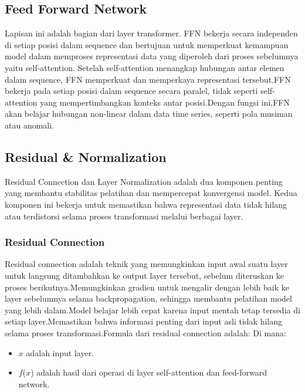 \subsection{Feed Forward Network}
Lapisan ini adalah bagian dari layer transformer. FFN bekerja secara independen di setiap posisi dalam sequence dan bertujuan untuk memperkuat kemampuan model dalam memproses representasi data yang diperoleh dari proses sebelumnya yaitu self-attention. Setelah self-attention menangkap hubungan antar elemen dalam sequence, FFN memperkuat dan memperkaya representasi tersebut.FFN bekerja pada setiap posisi dalam sequence secara paralel, tidak seperti self-attention yang mempertimbangkan konteks antar posisi.Dengan fungsi ini,FFN akan belajar hubungan non-linear dalam data time series, seperti pola musiman atau anomali.

\subsection{Residual \& Normalization}
Residual Connection dan Layer Normalization adalah dua komponen penting yang membantu stabilitas pelatihan dan mempercepat konvergensi model. Kedua komponen ini bekerja untuk memastikan bahwa representasi data tidak hilang atau terdistorsi selama proses transformasi melalui berbagai layer.
\subsubsection{Residual Connection}
Residual connection adalah teknik yang memungkinkan input awal suatu layer untuk langsung ditambahkan ke output layer tersebut, sebelum diteruskan ke proses berikutnya.Memungkinkan gradien untuk mengalir dengan lebih baik ke layer sebelumnya selama backpropagation, sehingga membantu pelatihan model yang lebih dalam.Model belajar lebih cepat karena input mentah tetap tersedia di setiap layer.Memastikan bahwa informasi penting dari input asli tidak hilang selama proses transformasi.Formula dari residual connection adalah: 
Di mana: 
\begin{itemize}
        \item \( x \) adalah input layer.
        \item \( f \)(\( x \)) adalah hasil dari operasi di layer self-attention dan feed-forward network.
    \end{itemize}

